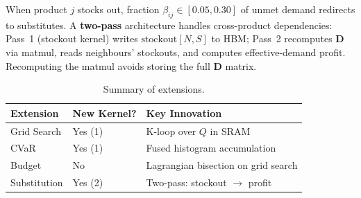 When product $j$ stocks out, fraction $\beta_{ij} \in [0.05, 0.30]$ of unmet demand redirects to substitutes. A \textbf{two-pass} architecture handles cross-product dependencies: Pass~1 (stockout kernel) writes $\text{stockout}[N,S]$ to HBM; Pass~2 recomputes $\mathbf{D}$ via matmul, reads neighbours' stockouts, and computes effective-demand profit. Recomputing the matmul avoids storing the full $\mathbf{D}$ matrix.

\begin{table}[H]
\centering\small
\caption{Summary of extensions.}
\label{tab:extensions}
\begin{tabular}{@{} l l l @{}}
    \toprule
    \textbf{Extension} & \textbf{New Kernel?} & \textbf{Key Innovation} \\
    \midrule
    Grid Search   & Yes (1) & K-loop over $Q$ in SRAM \\
    CVaR          & Yes (1) & Fused histogram accumulation \\
    Budget        & No      & Lagrangian bisection on grid search \\
    Substitution  & Yes (2) & Two-pass: stockout $\to$ profit \\
    \bottomrule
\end{tabular}
\end{table}
